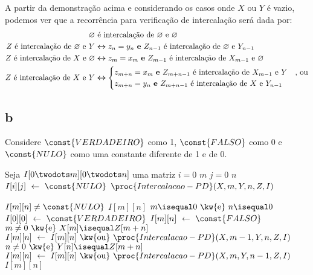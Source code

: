 \itemdsep
\newpage

A partir da demonstração acima e considerando os casos onde $X$ ou $Y$ é vazio, podemos ver que a recorrência para verificação de intercalação será dada por:
\begin{align*}
    \varnothing &\text{ é intercalação de } \varnothing \text{ e } \varnothing \\
    Z \text{ é intercalação de } \varnothing \text{ e } Y &\bm{\leftrightarrow} z_n = y_n \text{ \textbf{e} } Z_{n - 1} \text{ é intercalação de } \varnothing \text{ e } Y_{n - 1} \\
    Z \text{ é intercalação de } X \text{ e } \varnothing &\bm{\leftrightarrow} z_m = x_m \text{ \textbf{e} } Z_{m - 1} \text{ é intercalação de } X_{m - 1} \text{ e } \varnothing \\
    Z \text{ é intercalação de } X \text{ e } Y &\bm{\leftrightarrow} \begin{cases}
        z_{m + n} = x_m \text{ \textbf{e} } Z_{m + n - 1} \text{ é intercalação de } X_{m - 1} \text{ e } Y &\text{, ou} \\
        z_{m + n} = y_n \text{ \textbf{e} } Z_{m + n - 1} \text{ é intercalação de } X \text{ e } Y_{n - 1}
    \end{cases}
\end{align*}

\itemdsep

\subsection{b} Considere $\const{VERDADEIRO}$ como 1, $\const{FALSO}$ como 0 e $\const{NULO}$ como uma constante diferente de 1 e de 0.

\def\And{\mbox{ \kw{e} }}
\def\Or{\mbox{ \kw{ou} }}

\begin{codebox}
    \li Seja $I[0 \twodots m][0 \twodots n]$ uma matriz
    \li
    \li {} $i = 0$  $m$
        \Do
    \li     {} $j = 0$  $n$
            \Do
    \li         $I[i][j] \gets \const{NULO}$
            \End
        \End
    \li
    \li {} $\proc{Intercalacao-PD}(X, m, Y, n, Z, I)$
\end{codebox}

\begin{codebox}
    \li {} $I[m][n] \ne \const{NULO}$
        \Then
    \li     {} $I[m][n]$
        \End
    \li
    \li {} $m \isequal 0 \And n \isequal 0$
        \Then
    \li     $I[0][0] \gets \const{VERDADEIRO}$
        \End
    \li {}
        \Then
    \li     $I[m][n] \gets \const{FALSO}$
    \li     {} $m \ne 0 \And X[m] \isequal Z[m + n]$
            \Then
    \li         $I[m][n] \gets I[m][n] \Or \proc{Intercalacao-PD}(X, m - 1, Y, n, Z, I)$
            \End
    \li     {} $n \ne 0 \And Y[n] \isequal Z[m + n]$
            \Then
    \li         $I[m][n] \gets I[m][n] \Or \proc{Intercalacao-PD}(X, m, Y, n-1, Z, I)$
            \End
        \End
    \li
    \li {} $I[m][n]$
\end{codebox}


